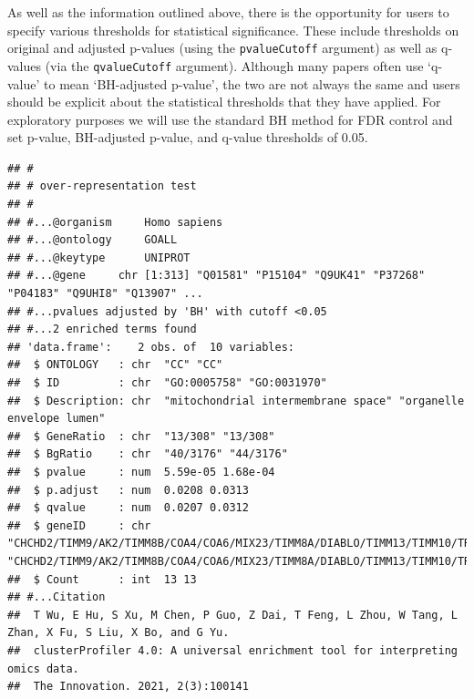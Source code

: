 \documentclass[9pt,a4paper,]{extarticle}
\newenvironment{Shaded}{\begin{snugshade}}{\end{snugshade}}
\newcommand{\AttributeTok}[1]{\textcolor[rgb]{0.13,0.29,0.53}{#1}}
\newcommand{\ConstantTok}[1]{\textcolor[rgb]{0.56,0.35,0.01}{#1}}
\newcommand{\DocumentationTok}[1]{\textcolor[rgb]{0.56,0.35,0.01}{\textbf{\textit{#1}}}}
\newcommand{\FloatTok}[1]{\textcolor[rgb]{0.00,0.00,0.81}{#1}}
\newcommand{\FunctionTok}[1]{\textcolor[rgb]{0.13,0.29,0.53}{\textbf{#1}}}
\newcommand{\NormalTok}[1]{#1}
\newcommand{\OtherTok}[1]{\textcolor[rgb]{0.56,0.35,0.01}{#1}}
\newcommand{\SpecialCharTok}[1]{\textcolor[rgb]{0.81,0.36,0.00}{\textbf{#1}}}
\newcommand{\StringTok}[1]{\textcolor[rgb]{0.31,0.60,0.02}{#1}}
\begin{document}
As well as the information outlined above, there is the opportunity for users to
specify various thresholds for statistical significance. These include
thresholds on original and adjusted p-values (using the \texttt{pvalueCutoff} argument)
as well as q-values (via the \texttt{qvalueCutoff} argument). Although many papers
often use `q- value' to mean `BH-adjusted p-value', the two are not always the
same and users should be explicit about the statistical thresholds that they
have applied. For exploratory purposes we will use the standard BH method for
FDR control and set p-value, BH-adjusted p-value, and q-value thresholds of
0.05.

\begin{Shaded}
\end{Shaded}

\begin{verbatim}
## #
## # over-representation test
## #
## #...@organism     Homo sapiens 
## #...@ontology     GOALL 
## #...@keytype      UNIPROT 
## #...@gene     chr [1:313] "Q01581" "P15104" "Q9UK41" "P37268" "P04183" "Q9UHI8" "Q13907" ...
## #...pvalues adjusted by 'BH' with cutoff <0.05 
## #...2 enriched terms found
## 'data.frame':    2 obs. of  10 variables:
##  $ ONTOLOGY   : chr  "CC" "CC"
##  $ ID         : chr  "GO:0005758" "GO:0031970"
##  $ Description: chr  "mitochondrial intermembrane space" "organelle envelope lumen"
##  $ GeneRatio  : chr  "13/308" "13/308"
##  $ BgRatio    : chr  "40/3176" "44/3176"
##  $ pvalue     : num  5.59e-05 1.68e-04
##  $ p.adjust   : num  0.0208 0.0313
##  $ qvalue     : num  0.0207 0.0312
##  $ geneID     : chr  "CHCHD2/TIMM9/AK2/TIMM8B/COA4/COA6/MIX23/TIMM8A/DIABLO/TIMM13/TIMM10/TRIAP1/CYCS" "CHCHD2/TIMM9/AK2/TIMM8B/COA4/COA6/MIX23/TIMM8A/DIABLO/TIMM13/TIMM10/TRIAP1/CYCS"
##  $ Count      : int  13 13
## #...Citation
##  T Wu, E Hu, S Xu, M Chen, P Guo, Z Dai, T Feng, L Zhou, W Tang, L Zhan, X Fu, S Liu, X Bo, and G Yu.
##  clusterProfiler 4.0: A universal enrichment tool for interpreting omics data.
##  The Innovation. 2021, 2(3):100141
\end{verbatim}
\end{document}
